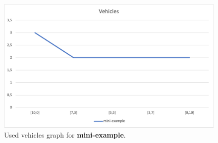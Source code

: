 \begin{figure}[H]
    \centering
    \includegraphics[height=0.25\textheight]{../graphs/mini-example-vehicles.png}
    \caption{Used vehicles graph for \textbf{mini-example}.}
\end{figure}

\newpage